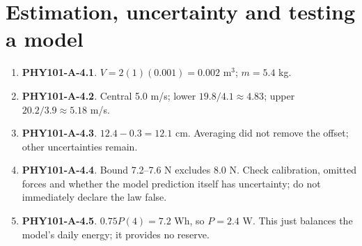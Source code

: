 \documentclass[11pt,a4paper,openany]{book}
\begin{document}
\section{Estimation, uncertainty and testing a model}
\begin{enumerate}
\item \textbf{PHY101-A-4.1}. $V=2(1)(0.001)=0.002$ m$^3$; $m=5.4$ kg.
\item \textbf{PHY101-A-4.2}. Central 5.0 m/s; lower $19.8/4.1\approx4.83$; upper $20.2/3.9\approx5.18$ m/s.
\item \textbf{PHY101-A-4.3}. $12.4-0.3=12.1$ cm. Averaging did not remove the offset; other uncertainties remain.
\item \textbf{PHY101-A-4.4}. Bound 7.2–7.6 N excludes 8.0 N. Check calibration, omitted forces and whether the model prediction itself has uncertainty; do not immediately declare the law false.
\item \textbf{PHY101-A-4.5}. $0.75P(4)=7.2$ Wh, so $P=2.4$ W. This just balances the model's daily energy; it provides no reserve.
\end{enumerate}
\end{document}
